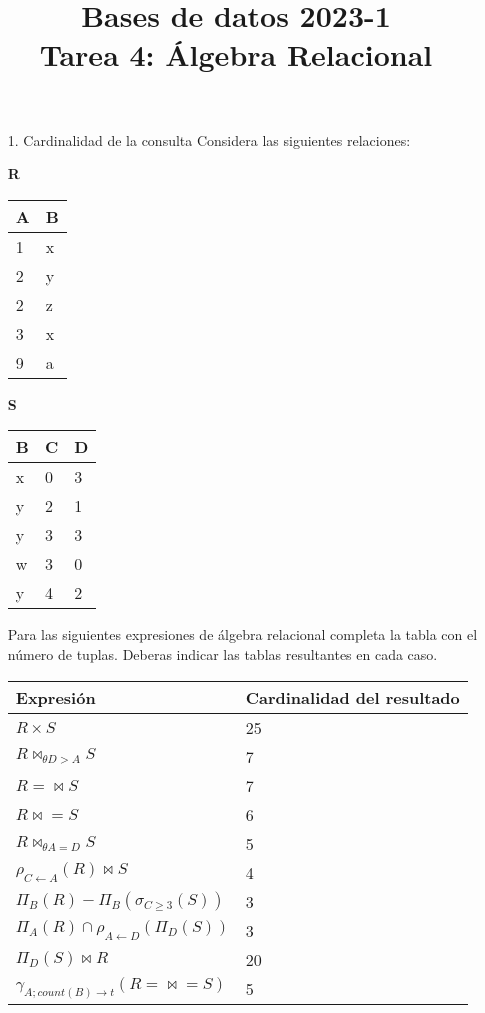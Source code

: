 \documentclass[12pt,a4paper]{article}
\title{Bases de datos 2023-1\\
Tarea 4: Álgebra Relacional}
\begin{document}
\maketitle

\begin{enumerate}
	\item[1.] Cardinalidad de la consulta
		Considera las siguientes relaciones:\\

		\begin{minipage}{0.5\textwidth}
		\textbf{R}\\
		\begin{tabular}{|l|l|}
			\hline
			A	& B\\
			\hline
			1	& x\\
			2	& y\\
			2	& z\\
			3	& x\\
			9	& a\\
			\hline
		\end{tabular}
		\end{minipage}
		\begin{minipage}{0.5\textwidth}
		\textbf{S}\\
		\begin{tabular}{|l|l|l|}
			\hline
			B	& C	& D\\
			\hline
			x	& 0	& 3\\
			y	& 2	& 1\\
			y	& 3	& 3\\
			w	& 3	& 0\\
			y	& 4	& 2\\
			\hline
		\end{tabular}
		\end{minipage}

		Para las siguientes expresiones de álgebra relacional completa la tabla con el número de tuplas.
		Deberas indicar las tablas resultantes en cada caso.\\
		\begin{tabular}{|l|l|}
			\hline
			Expresión		& Cardinalidad del resultado\\
			\hline
			$R \times S$											& 25\\
			$R \bowtie_{\theta D > A} S$							& 7\\
			$R =\bowtie  S$											& 7\\
			$R \bowtie=  S$											& 6\\
			$R \bowtie_{\theta A=D} S$								& 5\\
			$\rho_{C \leftarrow A}(R) \bowtie S$					& 4\\
			$\Pi_B (R) - \Pi_B (\sigma_{C \geq 3} (S))$				& 3\\
			$\Pi_A (R) \cap \rho_{A \leftarrow D} (\Pi_D (S))$		& 3\\
			$\Pi_D (S) \bowtie R$									&20\\
			$\gamma_{A ; count(B) \rightarrow t} (R =\bowtie= S)$	&5\\
			\hline
		\end{tabular}


\end{enumerate}
\end{document}

